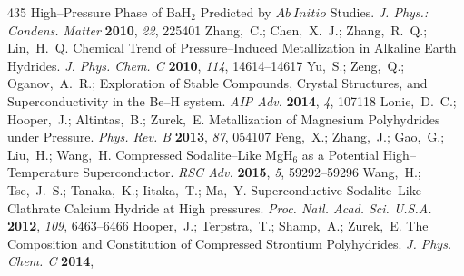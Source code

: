\documentclass[12pt,letterpaper,oneside]{article}
\begin{document}
\begin{mcitethebibliography}{435}
  High--Pressure Phase of BaH$_2$ Predicted by $Ab~Initio$ Studies. \emph{J.
  Phys.: Condens. Matter} \textbf{2010}, \emph{22}, 225401\relax
\mciteBstWouldAddEndPuncttrue
\mciteSetBstMidEndSepPunct{\mcitedefaultmidpunct}
{\mcitedefaultendpunct}{\mcitedefaultseppunct}\relax
\EndOfBibitem
{}
Zhang,~C.; Chen,~X.~J.; Zhang,~R.~Q.; Lin,~H.~Q. Chemical Trend of
  Pressure--Induced Metallization in Alkaline Earth Hydrides. \emph{J. Phys.
  Chem. C} \textbf{2010}, \emph{114}, 14614--14617\relax
\mciteBstWouldAddEndPuncttrue
\mciteSetBstMidEndSepPunct{\mcitedefaultmidpunct}
{\mcitedefaultendpunct}{\mcitedefaultseppunct}\relax
\EndOfBibitem
{}
Yu,~S.; Zeng,~Q.; Oganov,~A.~R.; 
  Exploration of Stable Compounds, Crystal Structures, and Superconductivity in
  the Be--H system. \emph{AIP Adv.} \textbf{2014}, \emph{4}, 107118\relax
\mciteBstWouldAddEndPuncttrue
\mciteSetBstMidEndSepPunct{\mcitedefaultmidpunct}
{\mcitedefaultendpunct}{\mcitedefaultseppunct}\relax
\EndOfBibitem
{}
Lonie,~D.~C.; Hooper,~J.; Altintas,~B.; Zurek,~E. Metallization of Magnesium
  Polyhydrides under Pressure. \emph{Phys. Rev. B} \textbf{2013}, \emph{87},
  054107\relax
\mciteBstWouldAddEndPuncttrue
\mciteSetBstMidEndSepPunct{\mcitedefaultmidpunct}
{\mcitedefaultendpunct}{\mcitedefaultseppunct}\relax
\EndOfBibitem
{}
Feng,~X.; Zhang,~J.; Gao,~G.; Liu,~H.; Wang,~H. Compressed Sodalite--Like
  MgH$_6$ as a Potential High--Temperature Superconductor. \emph{RSC Adv.}
  \textbf{2015}, \emph{5}, 59292--59296\relax
\mciteBstWouldAddEndPuncttrue
\mciteSetBstMidEndSepPunct{\mcitedefaultmidpunct}
{\mcitedefaultendpunct}{\mcitedefaultseppunct}\relax
\EndOfBibitem
{}
Wang,~H.; Tse,~J.~S.; Tanaka,~K.; Iitaka,~T.; Ma,~Y. Superconductive
  Sodalite--Like Clathrate Calcium Hydride at High pressures. \emph{Proc. Natl.
  Acad. Sci. U.S.A.} \textbf{2012}, \emph{109}, 6463--6466\relax
\mciteBstWouldAddEndPuncttrue
\mciteSetBstMidEndSepPunct{\mcitedefaultmidpunct}
{\mcitedefaultendpunct}{\mcitedefaultseppunct}\relax
\EndOfBibitem
{}
Hooper,~J.; Terpstra,~T.; Shamp,~A.; Zurek,~E. The Composition and Constitution
  of Compressed Strontium Polyhydrides. \emph{J. Phys. Chem. C} \textbf{2014},

\end{mcitethebibliography}
\end{document}
